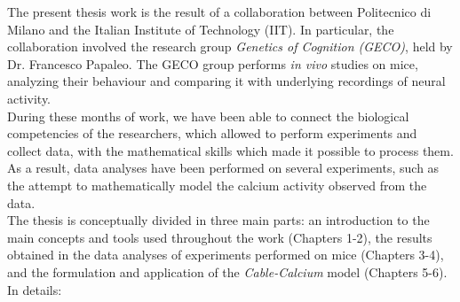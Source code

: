 \documentclass[12pt, a4paper]{report}
\begin{document}
	The present thesis work is the result of a collaboration between Politecnico di Milano and the Italian Institute of Technology (IIT). In particular, the collaboration involved the research group  \textit{Genetics of Cognition (GECO)}, held by Dr. Francesco Papaleo. The GECO group performs \textit{in vivo} studies on mice, analyzing their behaviour and comparing it  with underlying recordings of neural activity.\\
	During these months of work, we have been able to connect the biological competencies of the researchers, which allowed to perform experiments and collect data, with the mathematical skills which made it possible to process them. As a result, data analyses have been performed on several experiments, such as  the attempt to mathematically model the  calcium activity observed from the data.\\
	The  thesis is conceptually divided in three main parts: an introduction to the main concepts and tools used throughout the work (Chapters 1-2), the results obtained in the data analyses of experiments performed on mice (Chapters 3-4), and the formulation and application of the \textit{Cable-Calcium} model (Chapters 5-6). In details:
	
\end{document}
